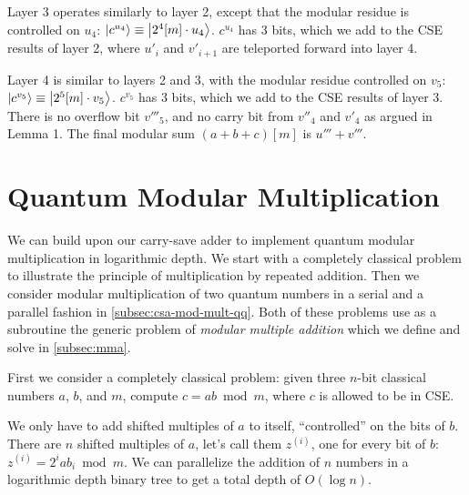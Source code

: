 \documentclass[twoside]{article}
\begin{document}
Layer 3
operates similarly to layer 2, except that the modular residue is controlled on
$u_4$:
$\left\vert{c^{u_4}}\right\rangle \equiv \left\vert{2^4[m] \cdot u_4}\right\rangle$.
$c^{u_4}$ has $3$ bits, which we
add to the CSE results of layer 2, where $u'_i$ and $v'_{i+1}$ are teleported
forward into layer 4.

Layer 4
is similar to layers 2 and 3, with the modular residue controlled on $v_5$:
$\left\vert{c^{v_5}}\right\rangle \equiv \left\vert{2^5[m] \cdot v_5}\right\rangle$.
$c^{v_5}$ has $3$ bits, which we
add to the CSE results of layer 3.
There is no overflow bit $v'''_5$, and no carry bit from $v''_4$ and $v'_4$
as argued in Lemma 1.
The final modular sum $(a+b+c)[m]$ is $u'''+v'''$.


%
\section{Quantum Modular Multiplication}
\label{sec:csa-mod-mult}

We can build upon our carry-save adder to implement quantum modular
multiplication in logarithmic depth. We start with a completely classical
problem to illustrate the principle of multiplication by repeated addition.
Then we consider modular multiplication of two quantum numbers in a serial
and a parallel fashion in
\ref{subsec:csa-mod-mult-qq}. Both of these problems use as a subroutine the
generic problem of \emph{modular multiple addition} which we define and solve
in \ref{subsec:mma}.

First we consider a completely classical problem:
given three $n$-bit classical numbers $a$, $b$, and $m$,
compute $c = ab \bmod m$, where $c$ is allowed to be in CSE.

We only have to add shifted
multiples of $a$ to itself, ``controlled'' on the bits of $b$. There are
$n$ shifted multiples of $a$, let's call them $z^{(i)}$, one for every bit of $b$:
$z^{(i)} = 2^i a b_i \bmod m$.
We can parallelize the addition of $n$ numbers in a logarithmic depth
binary tree to get a total depth of $O(\log n)$.
\end{document}
